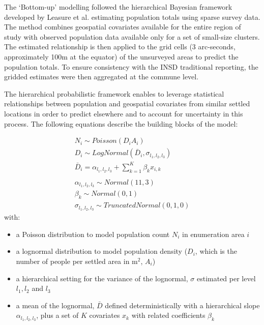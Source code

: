 \documentclass[]{book}
\providecommand{\tightlist}{%
  \setlength{\itemsep}{0pt}\setlength{\parskip}{0pt}}
\begin{document}
The `Bottom-up' modelling followed the hierarchical Bayesian framework
developed by Leasure et al. \citeyearpar{leasure2020national} estimating
population totals using sparse survey data. The method combines
geospatial covariates available for the entire region of study with
observed population data available only for a set of small-size
clusters. The estimated relationship is then applied to the grid cells
(3 arc-seconds, approximately 100m at the equator) of the unsurveyed
areas to predict the population totals. To ensure consistency with the
INSD traditional reporting, the gridded estimates were then aggregated
at the commune level.

The hierarchical probabilistic framework enables to leverage statistical
relationships between population and geospatial covariates from similar
settled locations in order to predict elsewhere and to account for
uncertainty in this process. The following equations describe the
building blocks of the model:

\[
\begin{gathered}
  N_i \sim Poisson( D_i A_i ) \\
  D_i \sim LogNormal( \bar{D}_i, \sigma_{l_1,l_2, l_3}) \\
  \bar{D}_i = \alpha_{l_1,l_2, l_3} + \sum_{k=1}^{K} \beta_k x_{i,k} \\ 
\\
\alpha_{l_1,l_2, l_3} \sim Normal(11,3)\\
\beta_k \sim Normal(0,1)\\
\sigma_{l_1,l_2, l_3} \sim Truncated Normal(0,1,0)
\end{gathered}
\] with:

\begin{itemize}
\tightlist
\item
  a Poisson distribution to model population count \(N_i\) in
  enumeration area \(i\)
\item
  a lognormal distribution to model population density (\(D_i\), which
  is the number of people per settled area in m\(^2\), \(A_i\))
\item
  a hierarchical setting for the variance of the lognormal, \(\sigma\)
  estimated per level \(l_1, l_2\) and \(l_3\)
\item
  a mean of the lognormal, \(\bar{D}\) defined deterministically with a
  hierarchical slope \(\alpha_{l_1,l_2,l_3}\), plus a set of \(K\)
  covariates \(x_k\) with related coefficients \(\beta_k\)
\end{itemize}
\end{document}
